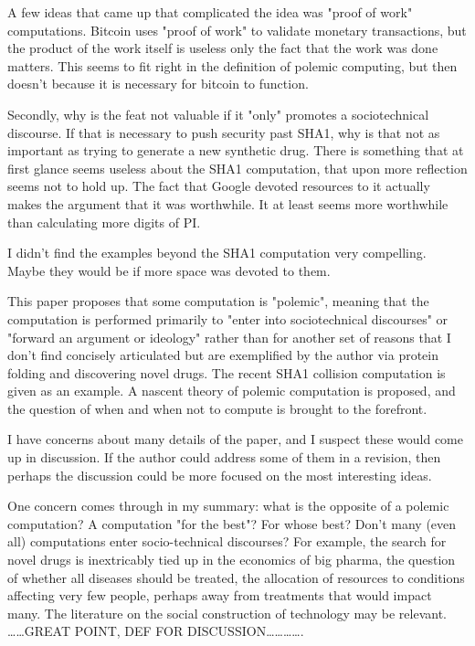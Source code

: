 \documentclass[sigconf]{acmart}
\begin{document}
A few ideas that came up that complicated the idea was "proof of work"
computations.   Bitcoin uses "proof of work" to validate monetary transactions,
but the product of the work itself is useless only the fact that the work was
done matters. This seems to fit right in the definition of polemic computing,
but then doesn't because it is necessary for bitcoin to function.

Secondly, why is the feat not valuable if it "only" promotes a sociotechnical
discourse.   If that is necessary to push security past SHA1, why is that not as
important as trying to generate a new synthetic drug.  There is something that
at first glance seems useless about the SHA1 computation, that upon more
reflection seems not to hold up. The fact that Google devoted resources to it
actually makes the argument that it was worthwhile.  It at least seems more
worthwhile than calculating more digits of PI.


I didn't find the examples beyond the SHA1 computation very compelling.  Maybe
they would be if more space was devoted to them.


This paper proposes that some computation is "polemic", meaning that the computation is performed primarily to "enter into sociotechnical discourses" or "forward an argument or ideology" rather than for another set of reasons that I don't find concisely articulated but are exemplified by the author via protein folding and discovering novel drugs. The recent SHA1 collision computation is given as an example. A nascent theory of polemic computation is proposed, and the question of when and when not to compute is brought to the forefront.

I have concerns about many details of the paper, and I suspect these would come up in discussion. If the author could address some of them in a revision, then perhaps the discussion could be more focused on the most interesting ideas.

One concern comes through in my summary: what is the opposite of a polemic computation? A computation "for the best"? For whose best? Don't many (even all) computations enter socio-technical discourses? For example, the search for novel drugs is inextricably tied up in the economics of big pharma, the question of whether all diseases should be treated, the allocation of resources to conditions affecting very few people, perhaps away from treatments that would impact many. The literature on the social construction of technology may be relevant.
\ldots{}\ldots{}GREAT POINT, DEF FOR DISCUSSION\ldots{}\ldots{}\ldots{}\ldots{}.
\end{document}
